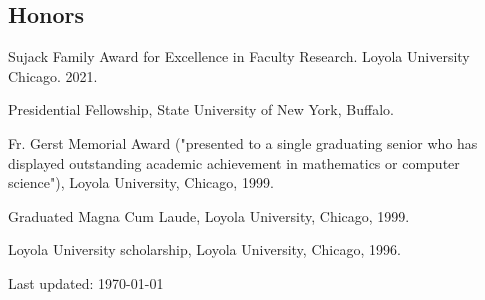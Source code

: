 \documentclass[letterpaper]{article}
\renewenvironment{itemize}{
  \begin{list}{}{
    \setlength{\leftmargin}{1.5em}
  }
}{
  \end{list}
}
\begin{document}
\subsection*{Honors}
\begin{itemize}
\item Sujack Family Award for Excellence in Faculty Research. Loyola University Chicago. 2021.
\item Presidential Fellowship, State University of New York, Buffalo.
\item Fr. Gerst Memorial Award ("presented to a single graduating senior who has displayed outstanding academic achievement in mathematics or computer science"), Loyola University, Chicago, 1999.
\item Graduated Magna Cum Laude, Loyola University, Chicago, 1999.
\item Loyola University scholarship, Loyola University, Chicago, 1996.
\end{itemize}

\bigskip

\begin{center}
\begin{footnotesize}
Last updated: \today \\
\end{footnotesize}
\end{center}
\end{document}
